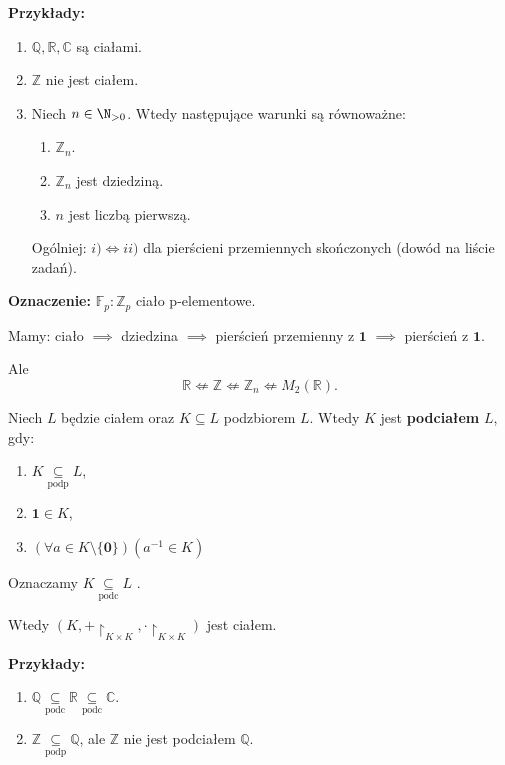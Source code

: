 \textbf{Przykłady:}
\begin{enumerate}[label=\arabic*)]
	\item $\mathbb{Q}, \mathbb{R} , \mathbb{C}  $ są ciałami.
	\item $\mathbb{Z} $ nie jest ciałem.
	\item Niech $n\in \N_{>0}$. Wtedy następujące warunki są równoważne:
		\begin{enumerate}[label=\roman*)]
			\item $\mathbb{Z}_{n}$.
			\item $\mathbb{Z} _{n} $ jest dziedziną.
			\item $n$ jest liczbą pierwszą.
		\end{enumerate}
		\noindent Ogólniej: $i)\iff ii)$ dla pierścieni przemiennych skończonych (dowód na liście zadań).
\end{enumerate}
\noindent \textbf{Oznaczenie: } $\mathbb{F}_{p}: \mathbb{Z}_{p}$ ciało p-elementowe. 

\begin{remark}
	Mamy:
	ciało $\implies$ dziedzina $\implies$ pierścień przemienny z $\mathbf{1}$ $\implies$ pierścień z $\mathbf{1}$.

	Ale
	\[
	\mathbb{R} \nLeftarrow \mathbb{Z} \nLeftarrow \mathbb{Z} _{n} \nLeftarrow M_{2}\left( \mathbb{R}  \right) 
	.\] 
\end{remark} 
\begin{definition}[Podciało.]
	Niech $L$ będzie ciałem oraz $K\subseteq L$ podzbiorem $L$. Wtedy $K$ jest \textbf{podciałem} $L$, gdy:
	\begin{enumerate}[label=\arabic*)]
		\item $K\underset{\scriptscriptstyle\text{podp}}{\subseteq} L$,
		\item $\mathbf{1} \in K$,
		\item $\left(\forall a \in K\setminus \{\mathbf{0}\}  \right) \left( a^{-1}\in K \right) $
	\end{enumerate}
\noindent Oznaczamy $K\underset{\scriptscriptstyle\text{podc}}{\subseteq} L$ .
\end{definition} 
\begin{remark}
	Wtedy $\left( K, +\restriction_{\scriptscriptstyle K\times K}, \cdot\restriction_{\scriptscriptstyle K\times K} \right) $ jest ciałem.
\end{remark} 
\noindent \textbf{Przykłady:}
\begin{enumerate}[label=\arabic*)]
	\item $\mathbb{Q} \underset{\scriptscriptstyle\text{podc}}{\subseteq} \mathbb{R} \underset{\scriptscriptstyle\text{podc}}{\subseteq} \mathbb{C} $.
	\item $\mathbb{Z} \underset{\scriptscriptstyle\text{podp}}{\subseteq} \mathbb{Q} $, ale  $\mathbb{Z} $ nie jest podciałem $\mathbb{Q} $.
\end{enumerate}
